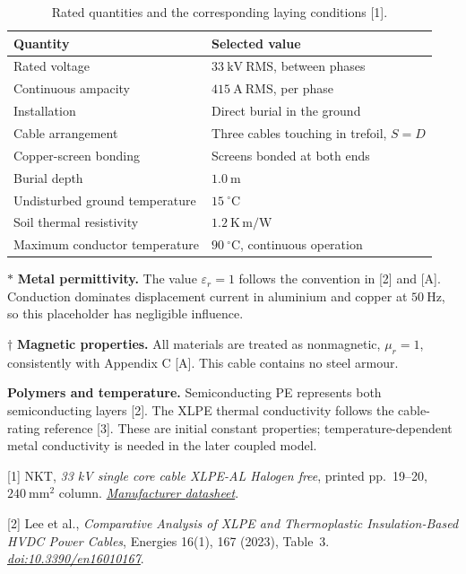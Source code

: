\documentclass[11pt,a4paper]{article}
\newcommand{\subhead}[1]{\par\medskip{\large\bfseries #1}\par\smallskip}
\newcommand{\source}[2]{\href{#1}{\textit{#2}}}
\begin{document}
\begin{table}[H]
\centering
\caption{Rated quantities and the corresponding laying conditions [1].}
\label{tab:rating}
\begin{tabularx}{\linewidth}{@{}l Y@{}}
\toprule
Quantity & Selected value\\
\midrule
Rated voltage & \(33~\mathrm{kV~RMS}\), between phases\\
Continuous ampacity & \(415~\mathrm{A~RMS}\), per phase\\
Installation & Direct burial in the ground\\
Cable arrangement & Three cables touching in trefoil, \(S=D\)\\
Copper-screen bonding & Screens bonded at both ends\\
Burial depth & \(1.0~\mathrm{m}\)\\
Undisturbed ground temperature & \(15~^\circ\mathrm{C}\)\\
Soil thermal resistivity & \(1.2~\mathrm{K\,m/W}\)\\
Maximum conductor temperature & \(90~^\circ\mathrm{C}\), continuous operation\\
\bottomrule
\end{tabularx}
\end{table}

\subhead{Material assumptions}
\(\boldsymbol{\ast}\) \textbf{Metal permittivity.}
The value \(\varepsilon_r=1\) follows the convention in [2] and [A].
Conduction dominates displacement current in aluminium and copper at \(50~\mathrm{Hz}\),
so this placeholder has negligible influence.

\(\boldsymbol{\dagger}\) \textbf{Magnetic properties.}
All materials are treated as nonmagnetic, \(\mu_r=1\), consistently with
Appendix C [A]. This cable contains no steel armour.

\textbf{Polymers and temperature.}
Semiconducting PE represents both semiconducting layers [2]. The XLPE thermal
conductivity follows the cable-rating reference [3]. These are initial constant
properties; temperature-dependent metal conductivity is needed in the later coupled model.

\subhead{References}
\begingroup\small\setlength{\parskip}{6pt}
[1] NKT, \textit{33 kV single core cable XLPE-AL Halogen free},
printed pp.~19--20, \(240~\mathrm{mm^2}\) column.
\source{https://nkt.widen.net/content/d8gut55fhb/pdf/33kV_1-core_XLPE-AL-RMP-FB-ST_CU_screen_DSENAPP_MV_DS_EN.pdf?u=gj0n1y}{Manufacturer datasheet}.

[2] Lee et al., \textit{Comparative Analysis of XLPE and Thermoplastic Insulation-Based
HVDC Power Cables}, Energies 16(1), 167 (2023), Table~3.
\source{https://doi.org/10.3390/en16010167}{doi:10.3390/en16010167}.
\end{document}
